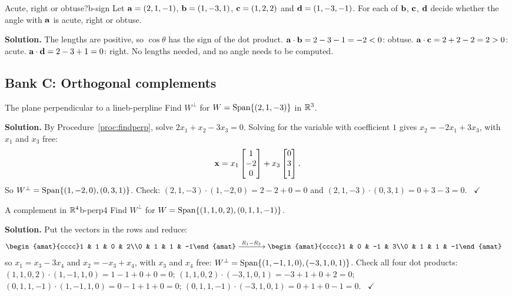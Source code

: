 \documentclass[11pt]{article}
\begin{document}
\begin{exmp}{Acute, right or obtuse?}{b-sign}
Let $\mathbf{a}=(2,1,-1)$, $\mathbf{b}=(1,-3,1)$, $\mathbf{c}=(1,2,2)$ and $\mathbf{d}=(1,-3,-1)$. For each of $\mathbf{b}$, $\mathbf{c}$, $\mathbf{d}$ decide whether the angle with $\mathbf{a}$ is acute, right or obtuse.

\textbf{Solution.} The lengths are positive, so $\cos\theta$ has the sign of the dot product. $\mathbf{a}\cdot\mathbf{b}=2-3-1=-2<0$: obtuse. $\mathbf{a}\cdot\mathbf{c}=2+2-2=2>0$: acute. $\mathbf{a}\cdot\mathbf{d}=2-3+1=0$: right. No lengths needed, and no angle needs to be computed.
\end{exmp}

\subsection*{Bank C: Orthogonal complements}
\begin{exmp}{The plane perpendicular to a line}{b-perpline}
Find $W^{\perp}$ for $W=\operatorname{Span}\{(2,1,-3)\}$ in $\mathbb{R}^3$.

\textbf{Solution.} By Procedure~\ref{proc:findperp}, solve $2x_1+x_2-3x_3=0$. Solving for the variable with coefficient $1$ gives $x_2=-2x_1+3x_3$, with $x_1$ and $x_3$ free:
\[
\mathbf{x}=x_1\begin{bmatrix}1\\-2\\0\end{bmatrix}+x_3\begin{bmatrix}0\\3\\1\end{bmatrix}.
\]
So $W^{\perp}=\operatorname{Span}\{(1,-2,0),(0,3,1)\}$. Check: $(2,1,-3)\cdot(1,-2,0)=2-2+0=0$ and $(2,1,-3)\cdot(0,3,1)=0+3-3=0$. \ $\checkmark$
\end{exmp}

\begin{exmp}{A complement in $\mathbb{R}^4$}{b-perp4}
Find $W^{\perp}$ for $W=\operatorname{Span}\{(1,1,0,2),(0,1,1,-1)\}$.

\textbf{Solution.} Put the vectors in the rows and reduce:
\begin{align*}
\begin{amat}{cccc}1 & 1 & 0 & 2\\0 & 1 & 1 & -1\end{amat}
&\rops{R_1-R_2}
\begin{amat}{cccc}1 & 0 & -1 & 3\\0 & 1 & 1 & -1\end{amat}
\end{align*}
so $x_1=x_3-3x_4$ and $x_2=-x_3+x_4$, with $x_3$ and $x_4$ free: $W^{\perp}=\operatorname{Span}\{(1,-1,1,0),(-3,1,0,1)\}$. Check all four dot products: $(1,1,0,2)\cdot(1,-1,1,0)=1-1+0+0=0$; $(1,1,0,2)\cdot(-3,1,0,1)=-3+1+0+2=0$; $(0,1,1,-1)\cdot(1,-1,1,0)=0-1+1+0=0$; $(0,1,1,-1)\cdot(-3,1,0,1)=0+1+0-1=0$. \ $\checkmark$
\end{exmp}
\end{document}
